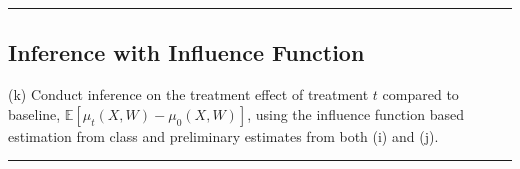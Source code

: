 \documentclass{article}
\newenvironment{colorparagraph}[1]{\par\color{#1}}{\par}
\begin{document}
\begin{colorparagraph}{questioncolor}
\label{q3k}
\rule{\textwidth}{0.5pt}
\subsection{Inference with Influence Function}
(k) Conduct inference on the treatment effect of treatment \( t \) compared to baseline, \( \mathbb{E}[\mu_t(X, W) - \mu_0(X, W)] \), using the influence function based estimation from class and preliminary estimates from both (i) and (j).

\rule{\textwidth}{0.5pt}
\end{colorparagraph}
\end{document}
